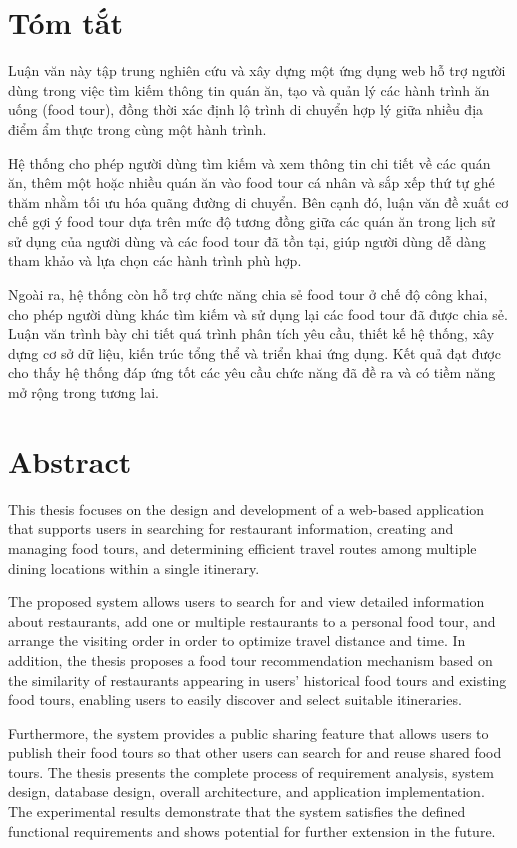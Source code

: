 \cleardoublepage
\section*{Tóm tắt}
Luận văn này tập trung nghiên cứu và xây dựng một ứng dụng web hỗ trợ người dùng trong việc
tìm kiếm thông tin quán ăn, tạo và quản lý các hành trình ăn uống (food tour), đồng thời xác định
lộ trình di chuyển hợp lý giữa nhiều địa điểm ẩm thực trong cùng một hành trình.

Hệ thống cho phép người dùng tìm kiếm và xem thông tin chi tiết về các quán ăn, thêm một hoặc
nhiều quán ăn vào food tour cá nhân và sắp xếp thứ tự ghé thăm nhằm tối ưu hóa quãng đường
di chuyển. Bên cạnh đó, luận văn đề xuất cơ chế gợi ý food tour dựa trên mức độ tương đồng
giữa các quán ăn trong lịch sử sử dụng của người dùng và các food tour đã tồn tại, giúp người
dùng dễ dàng tham khảo và lựa chọn các hành trình phù hợp.

Ngoài ra, hệ thống còn hỗ trợ chức năng chia sẻ food tour ở chế độ công khai, cho phép người
dùng khác tìm kiếm và sử dụng lại các food tour đã được chia sẻ. Luận văn trình bày chi tiết quá
trình phân tích yêu cầu, thiết kế hệ thống, xây dựng cơ sở dữ liệu, kiến trúc tổng thể và triển khai
ứng dụng. Kết quả đạt được cho thấy hệ thống đáp ứng tốt các yêu cầu chức năng đã đề ra và có
tiềm năng mở rộng trong tương lai.
\cleardoublepage
\section*{Abstract}

This thesis focuses on the design and development of a web-based application that supports
users in searching for restaurant information, creating and managing food tours, and determining
efficient travel routes among multiple dining locations within a single itinerary.

The proposed system allows users to search for and view detailed information about restaurants,
add one or multiple restaurants to a personal food tour, and arrange the visiting order in order to
optimize travel distance and time. In addition, the thesis proposes a food tour recommendation
mechanism based on the similarity of restaurants appearing in users’ historical food tours and
existing food tours, enabling users to easily discover and select suitable itineraries.

Furthermore, the system provides a public sharing feature that allows users to publish their food
tours so that other users can search for and reuse shared food tours. The thesis presents the
complete process of requirement analysis, system design, database design, overall architecture,
and application implementation. The experimental results demonstrate that the system satisfies
the defined functional requirements and shows potential for further extension in the future.